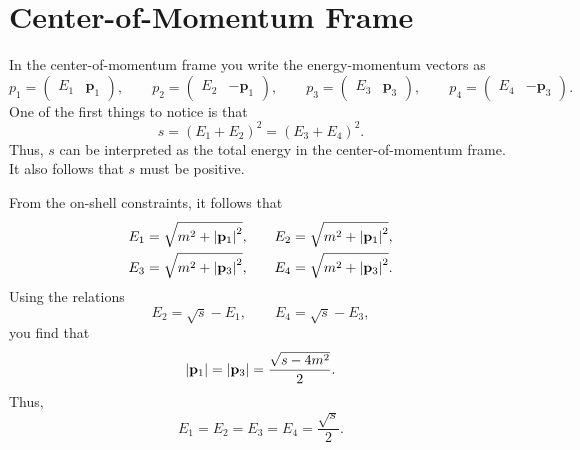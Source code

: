 \section{Center-of-Momentum Frame}
In the center-of-momentum frame you write the energy-momentum vectors as
\begin{equation}
	p_{1} = \begin{pmatrix} E_{1} & \mathbf{p}_{1} \end{pmatrix}, \qquad p_{2} = \begin{pmatrix} E_{2} & -\mathbf{p}_{1} \end{pmatrix}, \qquad p_{3} = \begin{pmatrix} E_{3} & \mathbf{p}_{3} \end{pmatrix}, \qquad p_{4} = \begin{pmatrix} E_{4} & -\mathbf{p}_{3} \end{pmatrix}.
\end{equation}
One of the first things to notice is that
\begin{equation}
	s = (E_{1} + E_{2})^{2} = (E_{3} + E_{4})^{2}.
\end{equation}
Thus, $s$ can be interpreted as the total energy in the center-of-momentum frame. It also follows that $s$ must be positive.

From the on-shell constraints, it follows that
\begin{equation}
\begin{split}
	E_{1} = \sqrt{m^{2} + \left\lvert \mathbf{p}_{1} \right\rvert^{2}}, &\qquad E_{2} = \sqrt{m^{2} + \left\lvert \mathbf{p}_{1} \right\rvert^{2}}, \\
	E_{3} = \sqrt{m^{2} + \left\lvert \mathbf{p}_{3} \right\rvert^{2}}, &\qquad E_{4} = \sqrt{m^{2} + \left\lvert \mathbf{p}_{3} \right\rvert^{2}}.
\end{split}
\end{equation}
Using the relations
\begin{equation}
	E_{2} = \sqrt{s} - E_{1}, \qquad E_{4} = \sqrt{s} - E_{3},
\end{equation}
you find that
\begin{equation}
	\left\lvert \mathbf{p}_{1} \right\rvert = \left\lvert \mathbf{p}_{3} \right\rvert = \frac{\sqrt{s - 4m^{2}}}{2}.
\end{equation}
Thus,
\begin{equation}
	E_{1} = E_{2} = E_{3} = E_{4} = \frac{\sqrt{s}}{2}.
\end{equation}
